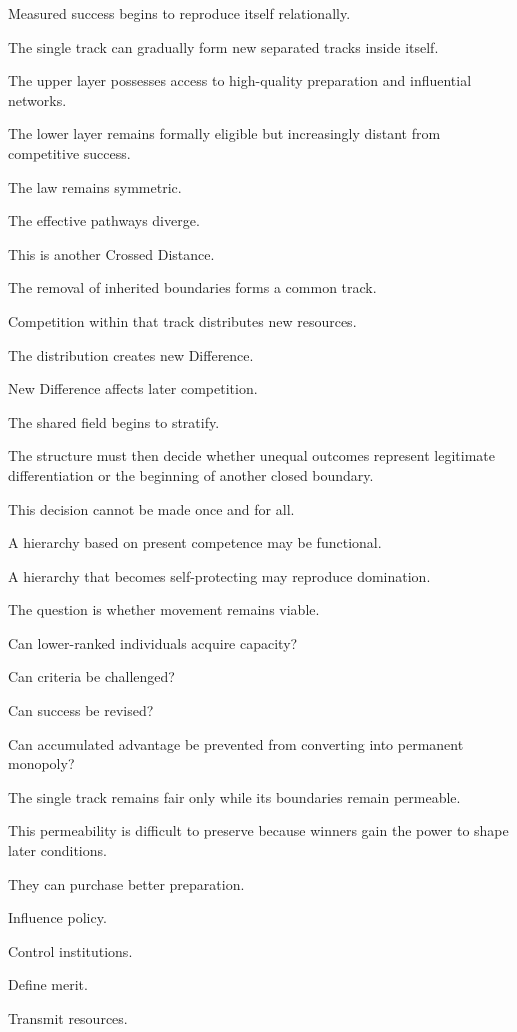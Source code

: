 Measured success begins to reproduce itself relationally.

The single track can gradually form new separated tracks inside itself.

The upper layer possesses access to high-quality preparation and influential networks.

The lower layer remains formally eligible but increasingly distant from competitive success.

The law remains symmetric.

The effective pathways diverge.

This is another Crossed Distance.

The removal of inherited boundaries forms a common track.

Competition within that track distributes new resources.

The distribution creates new Difference.

New Difference affects later competition.

The shared field begins to stratify.

The structure must then decide whether unequal outcomes represent legitimate differentiation or the beginning of another closed boundary.

This decision cannot be made once and for all.

A hierarchy based on present competence may be functional.

A hierarchy that becomes self-protecting may reproduce domination.

The question is whether movement remains viable.

Can lower-ranked individuals acquire capacity?

Can criteria be challenged?

Can success be revised?

Can accumulated advantage be prevented from converting into permanent monopoly?

The single track remains fair only while its boundaries remain permeable.

This permeability is difficult to preserve because winners gain the power to shape later conditions.

They can purchase better preparation.

Influence policy.

Control institutions.

Define merit.

Transmit resources.

